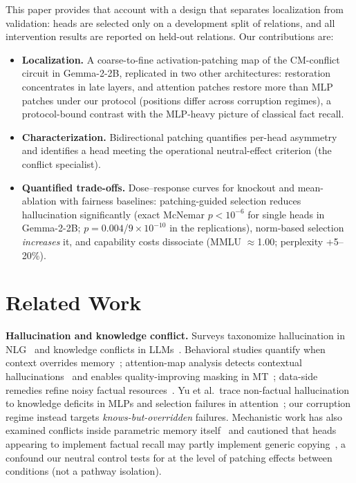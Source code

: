 \documentclass[paper]{ieice}
\newcommand{\emodel}{Gemma-2-2B}
\begin{document}
This paper provides that account with a design that separates localization
from validation: heads are selected only on a development split of
relations, and all intervention results are reported on held-out relations.
Our contributions are:
\begin{itemize}
\item \textbf{Localization.} A coarse-to-fine activation-patching map
of the CM-conflict circuit in \emodel{}, replicated in two other
architectures: restoration concentrates in late layers, and
attention patches restore more than MLP patches under our protocol
(positions differ across corruption regimes), a protocol-bound
contrast with the MLP-heavy picture of classical fact recall.
\item \textbf{Characterization.} Bidirectional patching quantifies
per-head asymmetry and identifies a head meeting the operational
neutral-effect criterion (the conflict specialist).
\item \textbf{Quantified trade-offs.} Dose--response curves for knockout
and mean-ablation with fairness baselines: patching-guided selection
reduces hallucination significantly (exact McNemar $p{<}10^{-6}$ for
single heads in \emodel{}; $p{=}0.004$/$9{\times}10^{-10}$ in the
replications), norm-based selection \emph{increases} it, and capability
costs dissociate (MMLU $\approx$1.00; perplexity +5--20\%).
\end{itemize}

\section{Related Work}
\label{sec:related}

\textbf{Hallucination and knowledge conflict.} Surveys taxonomize
hallucination in NLG~\cite{ji2023survey} and knowledge conflicts in
LLMs~\cite{xu2024knowledge}. Behavioral studies quantify when context
overrides memory~\cite{du2024context}; attention-map analysis detects
contextual hallucinations~\cite{chuang2024lookback} and enables
quality-improving masking in MT~\cite{cai2025attention}; data-side
remedies refine noisy factual resources~\cite{dong2026kg}.
Yu et al.\ trace non-factual hallucination to knowledge deficits in
MLPs and selection failures in attention~\cite{yu2024mechanistic}; our
corruption regime instead targets \emph{knows-but-overridden} failures.
Mechanistic work has also examined conflicts inside parametric memory
itself~\cite{pham2026intra} and cautioned that heads appearing to
implement factual recall may partly implement generic
copying~\cite{campregher2025}, a confound our neutral control
tests for at the level of patching effects between conditions (not a
pathway isolation).
\end{document}
